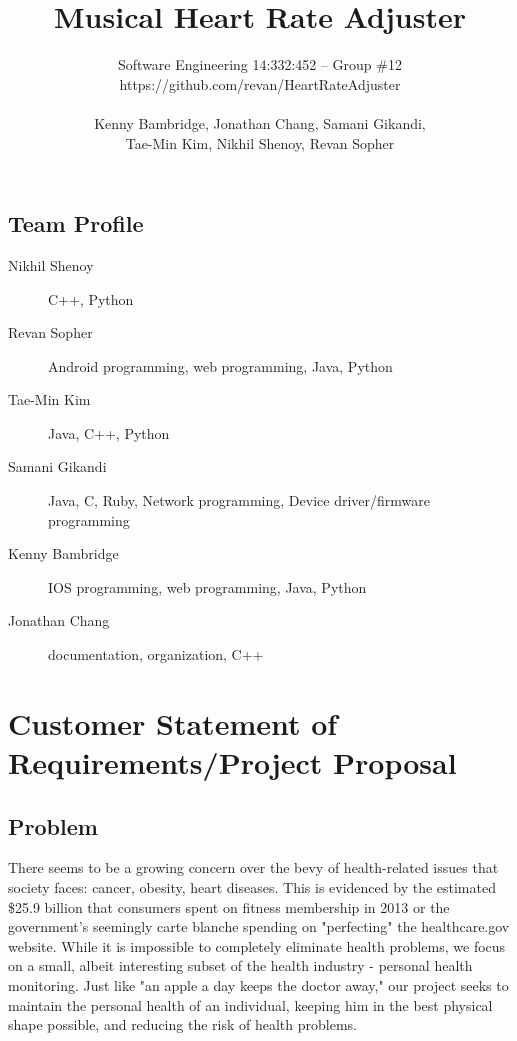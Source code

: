 \documentclass[letterpaper,english, 12pt]{scrreprt}
\title{Musical Heart Rate Adjuster}
\author{Software Engineering 14:332:452 -- Group \#12 \\ https://github.com/revan/HeartRateAdjuster \\ 
\\Kenny Bambridge, Jonathan Chang, Samani Gikandi,
\\Tae-Min Kim, Nikhil Shenoy, Revan Sopher}
\begin{document}
\maketitle

\tableofcontents

\section*{Team Profile}
\begin{description}
	\item[Nikhil Shenoy] C++, Python
	\item[Revan Sopher] Android programming, web programming, Java, Python
	\item[Tae-Min Kim] Java, C++, Python
	\item[Samani Gikandi] Java, C, Ruby, Network programming, Device driver/firmware programming
	\item[Kenny Bambridge] IOS programming, web programming, Java, Python
	\item[Jonathan Chang] documentation, organization, C++
\end{description}
 
\chapter{Customer Statement of Requirements/Project Proposal}
 
\section{Problem}
There seems to be a growing concern over the bevy of health-related issues that society faces: cancer, obesity, heart diseases. This is evidenced by the estimated \$25.9 billion that consumers spent on fitness membership in 2013 or the government's seemingly carte blanche spending on "perfecting" the healthcare.gov website. While it is impossible to completely eliminate health problems, we focus on a small, albeit interesting subset of the health industry - personal health monitoring. Just like "an apple a day keeps the doctor away," our project seeks to maintain the personal health of an individual, keeping him in the best physical shape possible, and reducing the risk of health problems. \\
 
\end{document}
